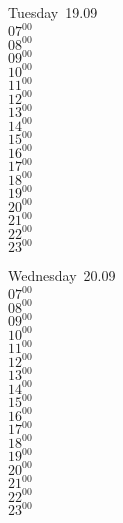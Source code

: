 \documentclass[11pt, a4paper]{book}\usepackage[]{graphicx}\usepackage[]{color}
\begin{document}
\begin{weekdaybox}
  Tuesday~19.09\\
  { 
  \vfill
  $07^{00}$\\
$08^{00}$\\
$09^{00}$\\
$10^{00}$\\
$11^{00}$\\
$12^{00}$\\
$13^{00}$\\
$14^{00}$\\
$15^{00}$\\
$16^{00}$\\
$17^{00}$\\
$18^{00}$\\
$19^{00}$\\
$20^{00}$\\
$21^{00}$\\
$22^{00}$\\
$23^{00}$\\
  }
\end{weekdaybox}
\begin{weekdaybox}
  Wednesday~20.09\\
  { 
  \vfill
  $07^{00}$\\
$08^{00}$\\
$09^{00}$\\
$10^{00}$\\
$11^{00}$\\
$12^{00}$\\
$13^{00}$\\
$14^{00}$\\
$15^{00}$\\
$16^{00}$\\
$17^{00}$\\
$18^{00}$\\
$19^{00}$\\
$20^{00}$\\
$21^{00}$\\
$22^{00}$\\
$23^{00}$\\
  }
\end{weekdaybox}
\clearpage
\begin{headerbox}
\end{headerbox}
\end{document}
